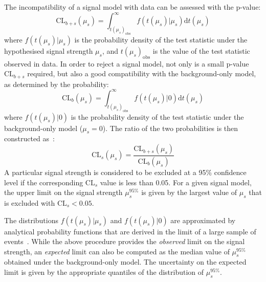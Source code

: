 The incompatibility of a signal model with data can be assessed with the 
p-value:
\begin{equation}
\mathrm{CL}_{b+s}(\mu_s) = \int_{t(\mu_s)_{\mathrm{obs}}}^{\infty} 
f(t(\mu_s)|\mu_s) \mathrm{d}t(\mu_s)
\end{equation}
where $f(t(\mu_s)|\mu_s)$ is the probability density of the test statistic 
under the hypothesised signal strength $\mu_s$, and $t(\mu_s)_{\mathrm{obs}}$ 
is 
the value of the test statistic observed in 
data. In order to reject a signal model, not only is a small p-value 
$\mathrm{CL}_{b+s}$ 
required, but also a good compatibility with the background-only model, as 
determined by the probability:
\begin{equation}
\mathrm{CL}_{b}(\mu_s) = \int_{t(\mu_s)_{\mathrm{obs}}}^{\infty} f(t(\mu_s)|0) 
\mathrm{d}t(\mu_s)
\end{equation}
where $f(t(\mu_s)|0)$ is the probability density of the test statistic under 
the background-only model ($\mu_s=0$). The ratio of the two probabilities is 
then constructed as~\cite{cls1,cls2}:
\begin{equation}
\mathrm{CL}_s(\mu_s) = \frac{\mathrm{CL}_{b+s}(\mu_s)}{\mathrm{CL}_{b}(\mu_s)}
\end{equation}
A particular signal strength is considered to be excluded at a 95\% confidence 
level if the corresponding $\mathrm{CL}_s$ value is less than 0.05. For a given 
signal model, the upper limit on the signal strength $\mu_s^{95\%}$ is given by 
the largest value of $\mu_s$ that is excluded with $\mathrm{CL}_s<0.05$. 

The distributions $f(t(\mu_s)|\mu_s)$ and $f(t(\mu_s)|0)$ are approximated by 
analytical probability 
functions that are derived in the limit of a large sample of 
events~\cite{asymptotic-formulae}. 
While the above procedure provides the \textit{observed} limit on the signal 
strength, an \textit{expected} limit can also be computed as the median value 
of $\mu_s^{95\%}$ obtained under the background-only model. The uncertainty on 
the expected limit is given by the appropriate quantiles of the distribution of 
$\mu_s^{95\%}$.



